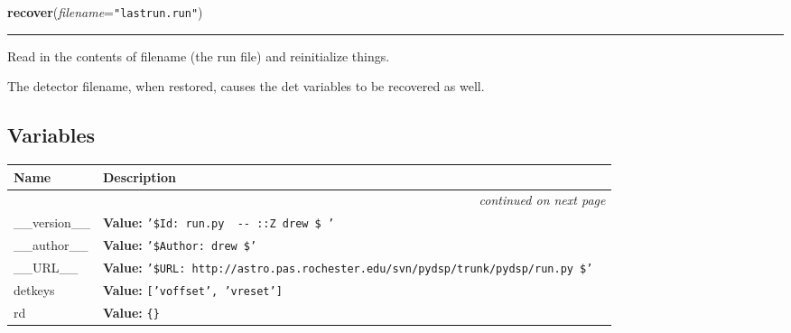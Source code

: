     \begin{boxedminipage}{\textwidth}

    \raggedright \textbf{recover}(\textit{filename}=\texttt{"lastrun.run"})

    \vspace{-1.5ex}

    \rule{\textwidth}{0.5\fboxrule}
    Read in the contents of filename (the run file) and reinitialize 
    things.

    The detector filename, when restored, causes the det variables to be 
    recovered as well.

    \vspace{1ex}

    \end{boxedminipage}



  \subsection{Variables}

\begin{longtable}{|p{}|p{}|l}
\cline{1-2}
\cline{1-2} \centering \textbf{Name} & \centering \textbf{Description}& \\
\cline{1-2}
\endhead\cline{1-2}\multicolumn{3}{r}{\small\textit{continued on next page}}\\\endfoot\cline{1-2}
\endlastfoot\raggedright \_\-\_\-v\-e\-r\-s\-i\-o\-n\-\_\-\_\- & \textbf{Value:} 
{\tt '\-\$\-I\-d\-:\-~\-r\-u\-n\-.\-p\-y\-~\-4\-0\-0\-~\-2\-0\-0\-6\--\-0\-6\--\-1\-9\-~\-2\-2\-:\-3\-9\-:\-3\-0\-Z\-~\-d\-r\-e\-w\-~\-\$\-~\-'\-}&\\
\cline{1-2}
\raggedright \_\-\_\-a\-u\-t\-h\-o\-r\-\_\-\_\- & \textbf{Value:} 
{\tt '\-\$\-A\-u\-t\-h\-o\-r\-:\-~\-d\-r\-e\-w\-~\-\$\-'\-}&\\
\cline{1-2}
\raggedright \_\-\_\-U\-R\-L\-\_\-\_\- & \textbf{Value:} 
{\tt '\-\$\-U\-R\-L\-:\-~\-h\-t\-t\-p\-:\-/\-/\-a\-s\-t\-r\-o\-.\-p\-a\-s\-.\-r\-o\-c\-h\-e\-s\-t\-e\-r\-.\-e\-d\-u\-/\-s\-v\-n\-/\-p\-y\-d\-s\-p\-/\-t\-r\-u\-n\-k\-/\-p\-y\-d\-s\-p\-/\-r\-u\-n\-.\-p\-y\-~\-\$\-'\-}&\\
\cline{1-2}
\raggedright d\-e\-t\-k\-e\-y\-s\- & \textbf{Value:} 
{\tt [\-'\-v\-o\-f\-f\-s\-e\-t\-'\-,\-~\-'\-v\-r\-e\-s\-e\-t\-'\-]\-}&\\
\cline{1-2}
\raggedright r\-d\- & \textbf{Value:} 
{\tt \{\-\}\-}&\\
\cline{1-2}
\end{longtable}


